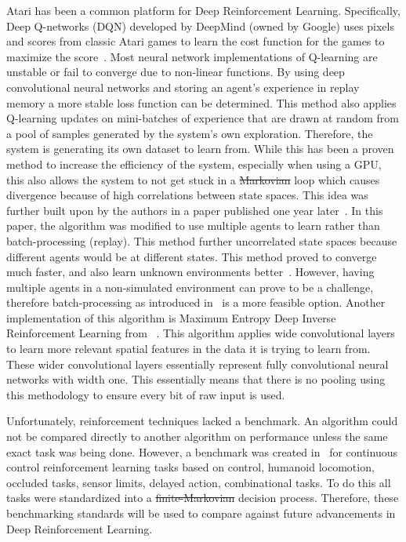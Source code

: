 \documentclass[12pt,american]{report}
\providecommand{\DIFaddtex}[1]{{\protect\color{blue}\uwave{#1}}} %
\providecommand{\DIFdeltex}[1]{{\protect\color{red}\sout{#1}}}                      %
\providecommand{\DIFaddbegin}{} %
\providecommand{\DIFaddend}{} %
\providecommand{\DIFdelbegin}{} %
\providecommand{\DIFdelend}{} %
\providecommand{\DIFadd}[1]{\texorpdfstring{\DIFaddtex{#1}}{#1}} %
\providecommand{\DIFdel}[1]{\texorpdfstring{\DIFdeltex{#1}}{}} %
\newcommand{\DIFscaledelfig}{0.5}
\newlength{\DIFdelgraphicswidth} %
\newlength{\DIFdelgraphicsheight} %
\newcommand{\DIFaddincludegraphics}[2][]{{\color{blue}\fbox{\DIFOincludegraphics[#1]{#2}}}} %
\newcommand{\DIFdelincludegraphics}[2][]{%
\sbox{\DIFdelgraphicsbox}{\DIFOincludegraphics[#1]{#2}}%
\settoboxwidth{\DIFdelgraphicswidth}{\DIFdelgraphicsbox} %
\settoboxtotalheight{\DIFdelgraphicsheight}{\DIFdelgraphicsbox} %
\scalebox{\DIFscaledelfig}{%
\parbox[b]{\DIFdelgraphicswidth}{\usebox{\DIFdelgraphicsbox}\\[-\baselineskip] \rule{\DIFdelgraphicswidth}{0em}}\llap{\resizebox{\DIFdelgraphicswidth}{\DIFdelgraphicsheight}{%
\setlength{\unitlength}{\DIFdelgraphicswidth}%
\begin{picture}(1,1)%
\thicklines\linethickness{2pt} %
{\color[rgb]{1,0,0}\put(0,0){\framebox(1,1){}}}%
{\color[rgb]{1,0,0}\put(0,0){\line( 1,1){1}}}%
{\color[rgb]{1,0,0}\put(0,1){\line(1,-1){1}}}%
\end{picture}%
}\hspace*{3pt}}} %
} %
\DeclareRobustCommand{\DIFaddbegin}{\DIFOaddbegin \let\includegraphics\DIFaddincludegraphics} %
\DeclareRobustCommand{\DIFaddend}{\DIFOaddend \let\includegraphics\DIFOincludegraphics} %
\DeclareRobustCommand{\DIFdelbegin}{\DIFOdelbegin \let\includegraphics\DIFdelincludegraphics} %
\DeclareRobustCommand{\DIFdelend}{\DIFOaddend \let\includegraphics\DIFOincludegraphics} %
\begin{document}
	Atari has been a common platform for Deep Reinforcement Learning. Specifically, Deep Q-networks (DQN) developed by DeepMind (owned by Google) uses pixels and scores from classic Atari games to learn the cost function for the games to maximize the score~\cite{mnih2015human}. Most neural network implementations of Q-learning are unstable or fail to converge due to non-linear functions. By using deep convolutional neural networks and storing an agent's experience in replay memory a more stable loss function can be determined.   This method also applies Q-learning updates on mini-batches of experience that are drawn at random from a pool of samples generated by the system's own exploration. Therefore, the system is generating its own dataset to learn from. While this has been a proven method to increase the efficiency of the system, especially when using a GPU, this also allows the system to not get stuck in a \DIFdelbegin \DIFdel{Markovian }\DIFdelend \DIFaddbegin \DIFadd{Markov }\DIFaddend loop which causes divergence because of high correlations between state spaces.  This idea was further built upon by the authors in a paper published one year later~\cite{mnih2016asynchronous}. In this paper, the algorithm was modified to use multiple agents to learn rather than batch-processing (replay). This method further uncorrelated state spaces because different agents would be at different states. This method proved to converge much faster, and also learn unknown environments better~\cite{mnih2016asynchronous}. However, having multiple agents in a non-simulated environment can prove to be a challenge, therefore batch-processing as introduced in~\cite{mnih2015human} is a more feasible option. Another implementation of this algorithm is Maximum Entropy Deep Inverse Reinforcement Learning from ~\cite{wulfmeier2015maximum}. This algorithm applies wide convolutional layers to learn more relevant spatial features in the data it is trying to learn from. These wider convolutional layers essentially represent fully convolutional neural networks with width one. This essentially means that there is no pooling using this methodology to ensure every bit of raw input is used. 

	Unfortunately, reinforcement techniques lacked a benchmark.  An algorithm could not be compared directly to another algorithm on performance unless the same exact task was being done.  However, a benchmark was created in~\cite{duan2016benchmarking} for continuous control reinforcement learning tasks based on control, humanoid locomotion, occluded tasks, sensor limits, delayed action, combinational tasks. To do this all tasks were standardized into a \DIFdelbegin \DIFdel{finite-Markovian }\DIFdelend \DIFaddbegin \DIFadd{finite-Markov }\DIFaddend decision process. Therefore, these benchmarking standards will be used to compare against future advancements in Deep Reinforcement Learning. 
\end{document}
